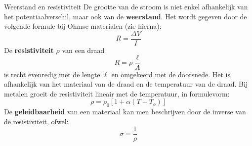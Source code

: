 \begin{theo}{Weerstand en resistiviteit}
    De grootte van de stroom is niet enkel afhankelijk van het potentiaalverschil, maar ook van de \textbf{weerstand}. Het wordt gegeven door de volgende formule bij Ohmse materialen (zie hierna):
    \begin{equation*}
        R = \dfrac{\Delta V}{I} 
    \end{equation*}
    De \textbf{resistiviteit} $\rho$ van een draad 
    \begin{equation*}
        R = \rho \dfrac{\ell}{A}
    \end{equation*}
    is recht evenredig met de lengte $\ell$ en omgekeerd met de doorsnede. Het is afhankelijk van het materiaal van de draad en de temperatuur van de draad. Bij metalen groeit de resistiviteit lineair met de temperatuur, in formulevorm:
    \begin{equation*}
        \rho = \rho_0\left[1+\alpha(T-T_o)\right]
    \end{equation*}
    De \textbf{geleidbaarheid} van een materiaal kan men beschrijven door de inverse van de resistiviteit, ofwel:
    \begin{equation*}
        \sigma = \dfrac{1}{\rho}
    \end{equation*}
    \vspace{-0.5cm}
\end{theo}

\newpage


